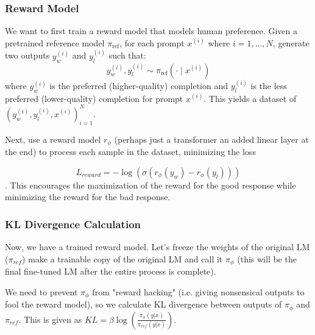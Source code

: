 \documentclass[12pt]{article}
\newcommand{\logp}[1]{%
  \log\left(#1\right)%
}
\newcommand{\sigp}[1]{%
  \sigma\left(#1\right)%
}
\begin{document}
\subsubsection{Reward Model}
We want to first train a reward model that models human preference. Given a pretrained reference model $\pi_{\mathrm{ref}}$, for each prompt $x^{(i)}$ where $i = 1, \ldots, N$, generate two outputs $y_w^{(i)}$ and $y_l^{(i)}$ such that:
\[
y_w^{(i)}, y_l^{(i)} \sim \pi_{\mathrm{ref}}(\cdot \mid x^{(i)})
\]
where $y_w^{(i)}$ is the preferred (higher-quality) completion and $y_l^{(i)}$ is the less preferred (lower-quality) completion for prompt $x^{(i)}$. This yields a dataset of $(y_w^{(i)}, y_l^{(i)}, x^{(i)})_{i=1}^{N}$. 

Next, use a reward model $r_{\phi}$ (perhaps just a transformer an added linear layer at the end) to process each sample in the dataset, minimizing the loss 

\[L_{reward} = -\logp{\sigp{r_{\phi}(y_w) - r_{\phi}(y_l)}}\]. This encourages the maximization of the reward for the good response while minimizing the reward for the bad response. 

\subsubsection{KL Divergence Calculation}
Now, we have a trained reward model. Let's freeze the weights of the original LM ($\pi_{ref}$) make a trainable copy of the original LM and call it $\pi_{\phi}$ (this will be the final fine-tuned LM after the entire process is complete). 

We need to prevent $\pi_{\phi}$ from "reward hacking" (i.e. giving nonsensical outputs to fool the reward model), so we calculate KL divergence between outputs of $\pi_{\phi}$ and $\pi_{ref}$. This is given as $KL = \beta\logp{\frac{\pi_{\phi}(y|x)}{\pi_{ref}(y|x)}}$. 
\end{document}
